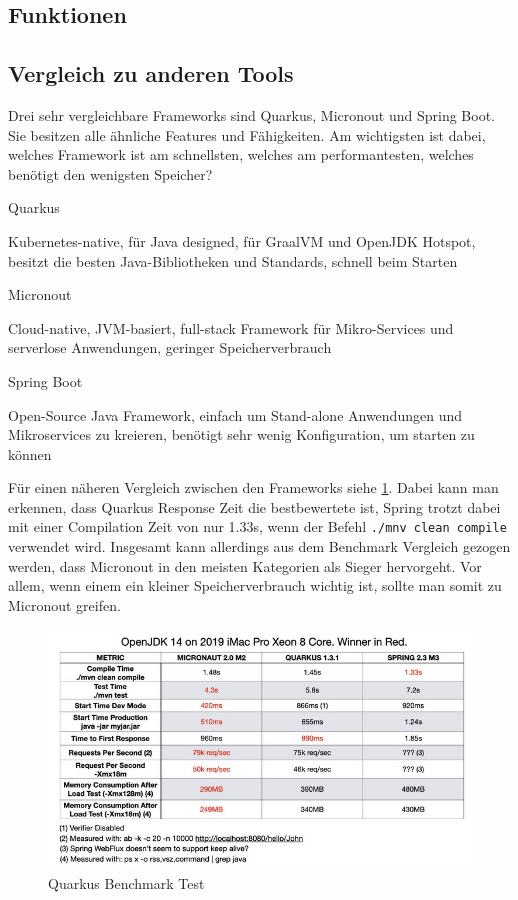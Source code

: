 \subsection{Funktionen}
\subsection{Vergleich zu anderen Tools}
Drei sehr vergleichbare Frameworks sind Quarkus, Micronout und Spring Boot. Sie besitzen alle ähnliche Features und Fähigkeiten.
Am wichtigsten ist dabei, welches Framework ist am schnellsten, welches am performantesten, welches benötigt den wenigsten Speicher?
 
 
\begin{compactitem}
    \item[Quarkus]
    \item Kubernetes-native, für Java designed, für GraalVM und OpenJDK Hotspot, besitzt die besten Java-Bibliotheken und Standards, schnell beim Starten
    \item[Micronout]
    \item Cloud-native, JVM-basiert, full-stack Framework für Mikro-Services und serverlose Anwendungen, geringer Speicherverbrauch
    \item[Spring Boot]
    \item Open-Source Java Framework, einfach um Stand-alone Anwendungen und Mikroservices zu kreieren, benötigt sehr wenig Konfiguration, um starten zu können
\end{compactitem}
 
Für einen näheren Vergleich zwischen den Frameworks siehe \ref{fig:impl:Quarkusbenchmark}. Dabei kann man erkennen, dass Quarkus Response Zeit die bestbewertete ist, Spring trotzt dabei mit einer Compilation Zeit von nur 1.33s, wenn der Befehl \texttt{./mnv clean compile} verwendet wird. Insgesamt kann allerdings aus dem Benchmark Vergleich gezogen werden, dass Micronout in den meisten Kategorien als Sieger hervorgeht. Vor allem, wenn einem ein kleiner Speicherverbrauch wichtig ist, sollte man somit zu Micronout greifen.
 
\begin{figure}
    \centering
    \includegraphics[scale=0.8]{pics/quarkus_benchmark.jpg}
    \caption{Quarkus Benchmark Test}
    \label{fig:impl:Quarkusbenchmark}
\end{figure}
 
